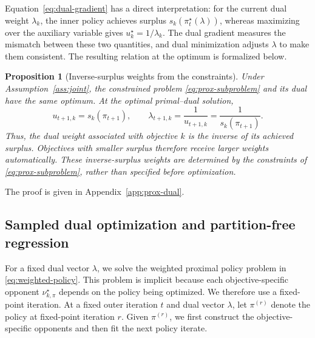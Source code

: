 \documentclass{article}
\newtheorem{proposition}{Proposition}
\theoremstyle{remark}
\theoremstyle{plain}
\begin{document}
Equation~\eqref{eq:dual-gradient} has a direct interpretation: for the current dual weight
$\lambda_k$, the inner policy achieves surplus $s_k(\pi_t^\star(\lambda))$, whereas maximizing
over the auxiliary variable gives $u_k^\star=1/\lambda_k$. The dual gradient measures the
mismatch between these two quantities, and dual minimization adjusts $\lambda$ to make them
consistent. The resulting relation at the optimum is formalized below.

\begin{proposition}[Inverse-surplus weights from the constraints]
\label{prop:prox-dual}
Under Assumption~\ref{ass:joint}, the constrained problem
\eqref{eq:prox-subproblem} and its dual have the same optimum.
At the optimal primal--dual solution,
\begin{equation}
u_{t+1,k}
=
s_k(\pi_{t+1}),
\qquad
\lambda_{t+1,k}
=
\frac{1}{u_{t+1,k}}
=
\frac{1}{s_k(\pi_{t+1})}.
\label{eq:kkt-weights}
\end{equation}
Thus, the dual weight associated with objective $k$ is the inverse of its achieved surplus.
Objectives with smaller surplus therefore receive larger weights automatically.
These inverse-surplus weights are determined by the constraints of
\eqref{eq:prox-subproblem}, rather than specified before optimization.
\end{proposition}
The proof is given in Appendix~\ref{app:prox-dual}.

\subsection{Sampled dual optimization and partition-free regression}
For a fixed dual vector $\lambda$, we solve the weighted proximal policy problem in
\eqref{eq:weighted-policy}. This problem is implicit because each objective-specific
opponent $\nu^\star_{k,\pi}$ depends on the policy being optimized. We therefore
use a fixed-point iteration. At a fixed outer iteration $t$ and dual vector
$\lambda$, let $\pi^{(r)}$ denote the policy at fixed-point iteration $r$. Given
$\pi^{(r)}$, we first construct the objective-specific opponents and then fit the
next policy iterate.
\end{document}
